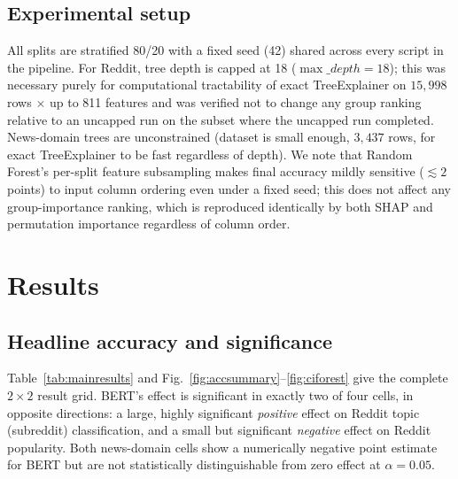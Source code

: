 \documentclass[conference]{IEEEtran}
\begin{document}
\subsection{Experimental setup}
\label{sec:setup}
All splits are stratified 80/20 with a fixed seed (42) shared across every script in the pipeline. For Reddit, tree depth is capped at 18 ($\max\_depth{=}18$); this was necessary purely for computational tractability of exact TreeExplainer on $15{,}998$ rows $\times$ up to 811 features and was verified not to change any group ranking relative to an uncapped run on the subset where the uncapped run completed. News-domain trees are unconstrained (dataset is small enough, $3{,}437$ rows, for exact TreeExplainer to be fast regardless of depth). We note that Random Forest's per-split feature subsampling makes final accuracy mildly sensitive ($\lesssim 2$ points) to input column ordering even under a fixed seed; this does not affect any group-importance ranking, which is reproduced identically by both SHAP and permutation importance regardless of column order.

\section{Results}
\label{sec:results}

\subsection{Headline accuracy and significance}

Table~\ref{tab:mainresults} and Fig.~\ref{fig:accsummary}--\ref{fig:ciforest} give the complete $2\times2$ result grid. BERT's effect is significant in exactly two of four cells, in opposite directions: a large, highly significant \emph{positive} effect on Reddit topic (subreddit) classification, and a small but significant \emph{negative} effect on Reddit popularity. Both news-domain cells show a numerically negative point estimate for BERT but are not statistically distinguishable from zero effect at $\alpha=0.05$.
\end{document}
